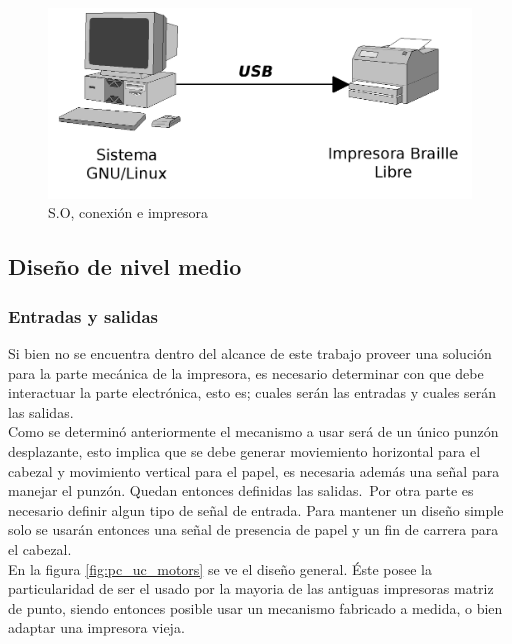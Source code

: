 \begin{figure}[htp]
\centering
\includegraphics[width=13cm]{./img/pc_usb_printer.png}
\caption{S.O, conexi\'on e impresora}
\label{fig:pc_usb_printer}
\end{figure}

\subsection{Dise\~no de nivel medio}
%


\subsubsection{Entradas y salidas}
%
Si bien no se encuentra dentro del alcance de este trabajo proveer una
soluci\'on para la parte mec\'anica de la impresora, es necesario determinar
con que debe interactuar la parte electr\'onica, esto es; cuales ser\'an las
entradas y cuales ser\'an las salidas.\\

Como se determin\'o anteriormente el mecanismo a usar ser\'a de un \'unico
punz\'on desplazante, esto implica que se debe generar moviemiento horizontal
para el cabezal y movimiento vertical para el papel, es necesaria adem\'as una
se\~nal para manejar el punz\'on. Quedan entonces definidas las salidas.\
Por otra parte es necesario definir algun tipo de se\~nal de entrada. Para
mantener un dise\~no simple solo se usar\'an entonces una se\~nal de presencia
de papel y un fin de carrera para el cabezal.\\

En la figura \ref{fig:pc_uc_motors} se ve el dise\~no general. \'Este posee la
particularidad de ser el usado por la mayoria de las antiguas impresoras
matriz de punto, siendo entonces posible usar un mecanismo fabricado a medida,
o bien adaptar una impresora vieja.


